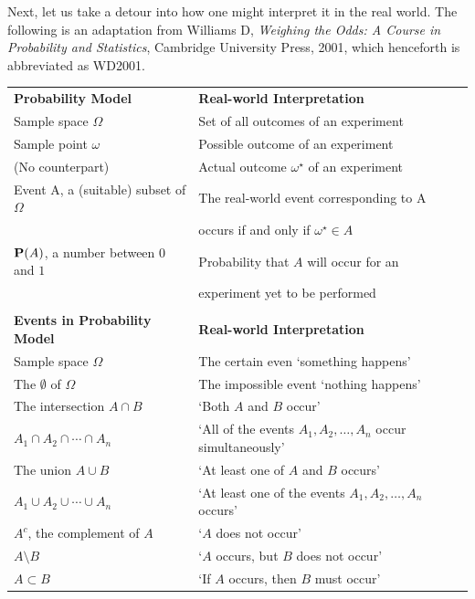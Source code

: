 Next, let us take a detour into how one might interpret it in the real world.  The following is an adaptation from Williams D, {\it Weighing the Odds: A Course in Probability and Statistics}, Cambridge University Press, 2001, which henceforth is abbreviated as WD2001.
\begin{center}
\begin{tabular}{l l}
{\bf Probability Model} & {\bf Real-world Interpretation} \\
Sample space $\Omega$ & Set of all outcomes of an experiment \\
Sample point $\omega$ & Possible outcome of an experiment \\ 
(No counterpart) & Actual outcome $\omega^{\star}$ of an experiment\\
Event A, a (suitable) subset of $\Omega$ & The real-world event corresponding to A \\
 & occurs if and only if $\omega^{\star} \in A$\\
$\mathbf{P}(A)$, a number between $0$ and $1$         & Probability that $A$ will occur for an \\
 & experiment yet to be performed \\
\\
{\bf Events in Probability Model} & {\bf Real-world Interpretation} \\
Sample space $\Omega$ & The certain even `something happens' \\
The $\emptyset$ of $\Omega$ & The impossible event `nothing happens' \\ 
The intersection $A \cap B$ & `Both $A$ and $B$ occur'\\
$A_1 \cap A_2 \cap \cdots \cap A_n $ & `All of the events $A_1, A_2, \ldots, A_n$ occur simultaneously'\\
The union $A \cup B$ & `At least one of $A$ and $B$ occurs'\\
$A_1 \cup A_2 \cup \cdots \cup A_n$ & `At least one of the events $A_1, A_2, \ldots, A_n$ occurs'\\
$A^c$, the complement of $A$ & `$A$ does not occur'\\
$A \setminus B$ & `$A$ occurs, but $B$ does not occur'\\
$A \subset B$ & `If $A$ occurs, then $B$ must occur'
\end{tabular}
\end{center}


